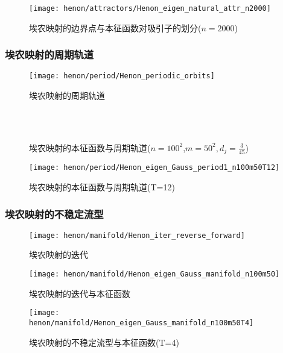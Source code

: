 \begin{figure}
	\centering
	\texttt{[image: henon/attractors/Henon\_eigen\_natural\_attr\_n2000]}
    \caption{埃农映射的边界点与本征函数对吸引子的划分($n=2000$)}
\end{figure}

\subsubsection{埃农映射的周期轨道}
\begin{figure}
	\centering
	\texttt{[image: henon/period/Henon\_periodic\_orbits]}
    \caption{埃农映射的周期轨道}
\end{figure}

\begin{figure}
    \centering
    \\
    \\
    \caption{埃农映射的本征函数与周期轨道($n=100^2$,$m=50^2,d_j=\frac{3}{45}$)}
\end{figure}

\begin{figure}
	\centering
	\texttt{[image: henon/period/Henon\_eigen\_Gauss\_period1\_n100m50T12]}
    \caption{埃农映射的本征函数与周期轨道(T=12)}
\end{figure}


\subsubsection{埃农映射的不稳定流型}

\begin{figure}
	\centering
	\texttt{[image: henon/manifold/Henon\_iter\_reverse\_forward]}
    \caption{埃农映射的迭代}
\end{figure}
\begin{figure}
	\centering
	\texttt{[image: henon/manifold/Henon\_eigen\_Gauss\_manifold\_n100m50]}
    \caption{埃农映射的迭代与本征函数}
\end{figure}
\begin{figure}
	\centering
	\texttt{[image: henon/manifold/Henon\_eigen\_Gauss\_manifold\_n100m50T4]}
    \caption{埃农映射的不稳定流型与本征函数(T=4)}
\end{figure}

